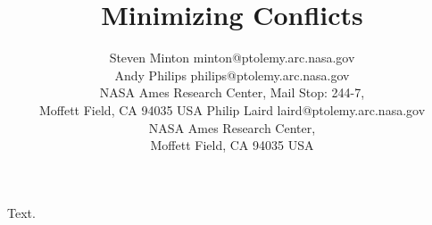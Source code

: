 \documentclass[twoside,11pt]{article}
\begin{document}
\title{Minimizing Conflicts}
\author{\name Steven Minton \email minton@ptolemy.arc.nasa.gov \\
       \name Andy Philips \email philips@ptolemy.arc.nasa.gov \\
       \addr NASA Ames Research Center, Mail Stop: 244-7,\\
       Moffett Field, CA  94035 USA
       \AND
       \name Philip Laird \email laird@ptolemy.arc.nasa.gov \\
       \addr NASA Ames Research Center,\\
       Moffett Field, CA  94035 USA}
\maketitle
Text.
\end{document}
